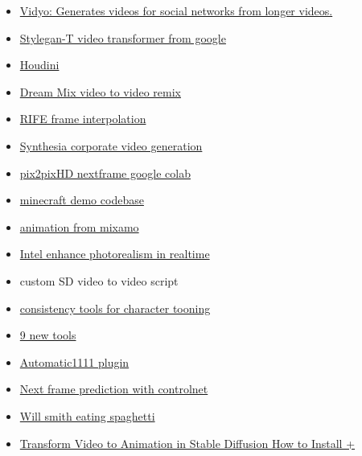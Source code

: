 \begin{itemize}
\item
  \href{https://vidyo.ai/}{Vidyo: Generates videos for social networks
  from longer videos.}
\item
  \href{https://sites.google.com/view/stylegan-t}{Stylegan-T video
  transformer from google}
\item
  \href{https://github.com/proceduralit/StableDiffusion_Houdini}{Houdini}
\item
  \href{https://dreamix-video-editing.github.io/}{Dream Mix video to
  video remix}
\item
  \href{https://github.com/megvii-research/ECCV2022-RIFE}{RIFE frame
  interpolation}
\item
  \href{https://www.youtube.com/watch?v=4uzzD9sD-PI}{Synthesia corporate
  video generation}
\item
  \href{https://colab.research.google.com/github/dvschultz/ml-art-colabs/blob/master/Pix2PixHD_Next_Frame_Prediction.ipynb}{pix2pixHD
  nextframe google colab}
\item
  \href{https://github.com/TSFSean/InvokeAI-DiffusionCraftAI}{minecraft
  demo codebase}
\item
  \href{https://www.reddit.com/r/StableDiffusion/comments/zecyc7/mixamo_animations_stable_diffusion_v2_depth2img/}{animation
  from mixamo}
\item
  \href{https://github.com/isl-org/PhotorealismEnhancement}{Intel
  enhance photorealism in realtime}
\item
  custom SD video to video script
\item
  \href{https://www.reddit.com/r/StableDiffusion/comments/11okvc8/how_about_another_joke_murraaaay/}{consistency
  tools for character tooning}
\item
  \href{https://twitter.com/mreflow/status/1637957302073565184}{9 new
  tools}
\item
  \href{https://www.reddit.com/r/StableDiffusion/comments/11w0ba9/modelscope_17b_text2video_model_is_now_available/}{Automatic1111
  plugin}
\item
  \href{https://www.reddit.com/r/StableDiffusion/comments/11f8i0g/next_frame_prediction_with_controlnet/}{Next
  frame prediction with controlnet}
\item
  \href{https://www.reddit.com/r/StableDiffusion/comments/1244h2c/will_smith_eating_spaghetti/}{Will
  smith eating spaghetti}
\item
  \href{https://www.youtube.com/watch?v=sVmi2Yp43c0\&t=22}{Transform
  Video to Animation in Stable Diffusion \textbar{} How to Install +
}
\end{itemize}
